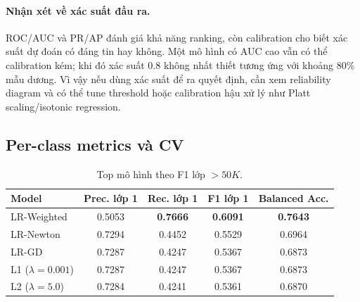 \documentclass[12pt,a4paper]{article}
\begin{document}
\paragraph{Nhận xét về xác suất đầu ra.}
ROC/AUC và PR/AP đánh giá khả năng ranking, còn calibration cho biết xác suất dự đoán có đáng tin hay không. Một mô hình có AUC cao vẫn có thể calibration kém; khi đó xác suất 0.8 không nhất thiết tương ứng với khoảng 80\% mẫu dương. Vì vậy nếu dùng xác suất để ra quyết định, cần xem reliability diagram và có thể tune threshold hoặc calibration hậu xử lý như Platt scaling/isotonic regression.

\subsection{Per-class metrics và CV}

\begin{table}[htbp]
\centering
\caption{Top mô hình theo F1 lớp $>50K$.}
\begin{tabular}{lcccc}
\toprule
\textbf{Model} & \textbf{Prec. lớp 1} & \textbf{Rec. lớp 1} & \textbf{F1 lớp 1} & \textbf{Balanced Acc.} \\
\midrule
LR-Weighted & 0.5053 & \textbf{0.7666} & \textbf{0.6091} & \textbf{0.7643} \\
LR-Newton & 0.7294 & 0.4452 & 0.5529 & 0.6964 \\
LR-GD & 0.7287 & 0.4247 & 0.5367 & 0.6873 \\
L1 ($\lambda=0.001$) & 0.7287 & 0.4247 & 0.5367 & 0.6873 \\
L2 ($\lambda=5.0$) & 0.7284 & 0.4241 & 0.5361 & 0.6870 \\
\bottomrule
\end{tabular}
\end{table}
\end{document}
